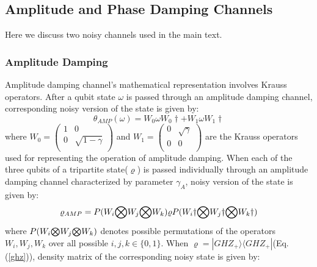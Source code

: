 \documentclass[pra,10pt,twocolumn,superscriptaddress,floatfix,showpacs]{revtex4-1}
\begin{document}
\subsection{Amplitude and Phase Damping Channels}
Here we discuss two noisy channels used in the main text.
\subsubsection{Amplitude Damping}
Amplitude damping channel's mathematical representation involves Krauss operators\cite{kra}. After a qubit state $\omega$ is passed through an amplitude damping channel, corresponding noisy version of the state is given by:
\begin{equation}\label{r2}
    \theta_{AMP}(\omega)=W_0\omega W_0\dag + W_1\omega W_1\dag
\end{equation}
 where $W_0=\left(
              \begin{array}{cc}
                1 & 0 \\
                0 & \sqrt{1-\gamma} \\
              \end{array}
            \right)$
and $W_1=\left(
              \begin{array}{cc}
                0 & \sqrt{\gamma} \\
                0 & 0 \\
              \end{array}
            \right)$
are the Krauss operators used for representing the operation of amplitude damping.  When each of the three qubits of a tripartite state($\varrho$) is passed individually through an amplitude damping channel characterized by parameter $\gamma_A$, noisy version of the state is given by:
\begin{equation}\label{krauss}
    \varrho_{AMP}=P( W_i\small{\bigotimes} W_j\small{\bigotimes} W_k)\varrho P( W_i\dag\small{\bigotimes} W_j\dag\small{\bigotimes} W_k\dag)
\end{equation}
where $P(W_i\small{\bigotimes} W_j\small{\bigotimes} W_k)$ denotes possible permutations of the operators $W_i,W_j,W_k$ over all possible $i,j,k\in\{0,1\}.$ When  $\varrho=|GHZ_+\rangle\langle GHZ_+|$(Eq.(\ref{ghz})), density matrix of the corresponding noisy state is given by:
\end{document}
